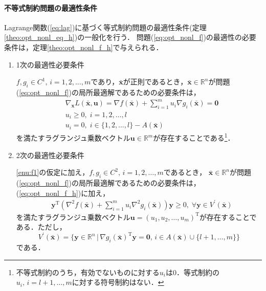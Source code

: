 \documentclass{jsreport}
\begin{document}
\paragraph{不等式制約問題の最適性条件}
Lagrange関数(\ref{eq:lag})に基づく等式制約問題の最適性条件(定理\ref{theo:opt_nonl_eq_h})の一般化を行う．
問題(\ref{eq:opt_nonl_f})の最適性の必要条件は，定理\ref{theo:opt_nonl_f_h}で与えられる．
\begin{theo}\label{theo:opt_nonl_f_h}
  \begin{enumerate}
    \item 1次の最適性必要条件\label{enu:f1}

    $f, g_i \in C^1, \, i = 1, 2, \ldots, m$であり，$\bar{\bm{x}}$が正則であるとき，$\bar{\bm{x}} \in \mathbb{R}^n$が問題(\ref{eq:opt_nonl_f})の局所最適解であるための必要条件は，
    \begin{align}\label{eq:opt_nonl_f_h}
      &\nabla_{\bm{x}} L(\bar{\bm{x}}, \bm{u}) = \nabla f(\bar{\bm{x}}) + \sum_{i = 1}^m u_i \nabla g_i(\bar{\bm{x}}) = \bm{0} \nonumber \\
      &u_i \geq 0, \; i = 1, 2, \ldots, l \nonumber \\
      &u_i = 0, \; i \in \{1, 2, \ldots, l\} - A(\bar{\bm{x}})
    \end{align}
    を満たすラグランジュ乗数ベクトル$\bm{u} \in \mathbb{R}^m$が存在することである\footnote{不等式制約のうち，有効でないものに対する$u_i$は$0$．等式制約の$u_i, \, i = l + 1, \ldots, m$に対する符号制約はない．}．

    \item 2次の最適性必要条件

    \ref{enu:f1}の仮定に加え，$f, g_i \in C^2, \, i = 1, 2, \ldots, m$であるとき，
    $\bar{\bm{x}} \in \mathbb{R}^n$が問題(\ref{eq:opt_nonl_f})の局所最適解であるための必要条件は，(\ref{eq:opt_nonl_f_h})に加え，
    \begin{align}\label{eq:opt_nonl_f_h_2}
      &\bm{y}^{\mathrm{T}} \left({\nabla}^2 f(\bar{\bm{x}}) + \sum_{i = 1}^m u_i {\nabla}^2 g_i(\bar{\bm{x}})\right) \bm{y} \geq 0, \; \forall \bm{y} \in V^{\prime}(\bar{\bm{x}})
    \end{align}
    を満たすラグランジュ乗数ベクトル$\bm{u} = (u_1, u_2, \ldots, u_m)^{\mathrm{T}}$が存在することである．ただし，
    \begin{equation}\label{eq:fv}
      V^{\prime}(\bar{\bm{x}}) = \{\bm{y} \in \mathbb{R}^n \, | \, \nabla g_i(\bar{\bm{x}})^{\mathrm{T}} \bm{y} = \bm{0}, \, i \in A(\bar{\bm{x}}) \cup \{l + 1, \ldots, m\} \}
    \end{equation}
    である．
  \end{enumerate}
\end{theo}
\end{document}
